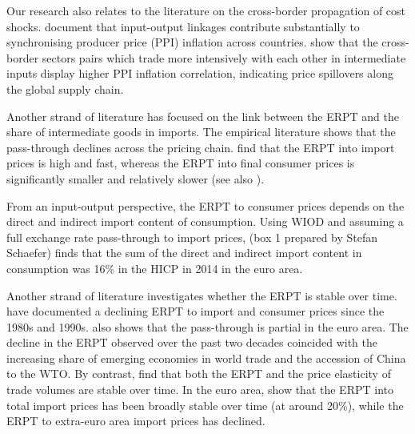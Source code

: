 \documentclass[11pt,a4paper]{article}
\begin{document}
Our research also relates to the literature on the cross-border propagation of cost shocks. 
\cite{Auer2019} document that input-output linkages contribute substantially to synchronising producer price (PPI) inflation across countries. %
\cite{AntoundeAlmeida2016} show that the cross-border sectors pairs which trade more intensively with each other in intermediate inputs display higher PPI inflation correlation, indicating  price spillovers along the global supply chain. 

Another strand of literature has focused on the link between the ERPT and the share of intermediate goods in imports. 
The empirical literature shows that the pass-through declines across the pricing chain. \cite{Ortega2020} find that the ERPT into import prices is high and fast, whereas the ERPT into final consumer prices is significantly smaller and relatively slower (see also \cite{Hahn2003, Kunovac2017, BenCheikh2017}).

From an input-output perspective, the ERPT to consumer prices depends on the direct and indirect import content of consumption. Using WIOD and assuming a full exchange rate pass-through to import prices, \cite{Ortega2020}{ (box 1 prepared by Stefan Schaefer)} finds that the sum of the direct and indirect import content in consumption was 16\% in the HICP in 2014 in the euro area.

Another strand of literature investigates whether the ERPT is stable over time. \cite{Campa2008} have documented a declining ERPT to import and consumer prices since the 1980s and 1990s. \cite{Ozyurt2016} also shows that the pass-through is partial in the euro area. The decline in the ERPT observed over the past two decades coincided with the increasing share of emerging economies in world trade and the accession of China to the WTO. By contrast, \cite{Leigh2017} find that both the ERPT and the price elasticity of trade volumes are stable over time. In the euro area, \cite{Ortega2020} show that the ERPT into total import prices has been broadly stable over time (at around 20\%), while the ERPT to extra-euro area import prices has declined.
\end{document}
